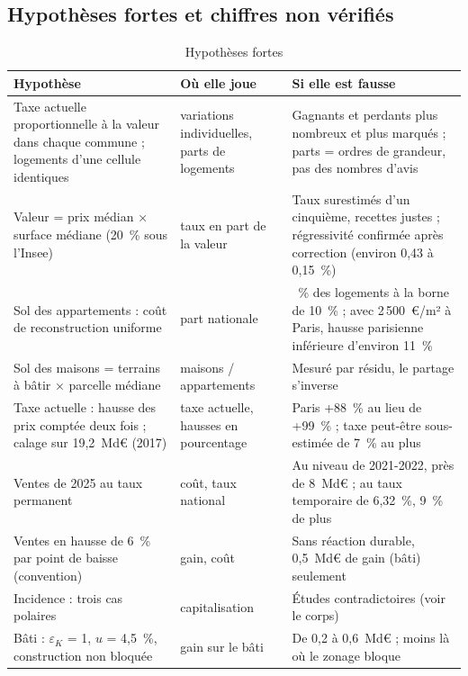 
\subsection{Hypothèses fortes et chiffres non vérifiés}

\begin{table}[!htbp]\centering\scriptsize
\caption{Hypothèses fortes}\label{tab:fon_hyp}
\begin{tabularx}{\linewidth}{@{}>{\raggedright\arraybackslash}p{4.3cm}>{\raggedright\arraybackslash}p{2.4cm}>{\raggedright\arraybackslash}X@{}}
\toprule
Hypothèse & Où elle joue & Si elle est fausse \\
\midrule
Taxe actuelle proportionnelle à la valeur dans chaque commune ; logements d'une cellule identiques & variations individuelles, parts de logements & Gagnants et perdants plus nombreux et plus marqués ; parts = ordres de grandeur, pas des nombres d'avis \\
Valeur = prix médian × surface médiane (20~\% sous l'Insee) & taux en part de la valeur & Taux surestimés d'un cinquième, recettes justes ; régressivité confirmée après correction (environ 0,43 à 0,15~\%) \\
Sol des appartements : coût de reconstruction uniforme & part nationale & 9~\% des logements à la borne de 10~\% ; avec 2\,500~€/m² à Paris, hausse parisienne inférieure d'environ 11~\% \\
Sol des maisons = terrains à bâtir × parcelle médiane & maisons / appartements & Mesuré par résidu, le partage s'inverse \\
Taxe actuelle : hausse des prix comptée deux fois ; calage sur 19,2~Md€ (2017) & taxe actuelle, hausses en pourcentage & Paris +88~\% au lieu de +99~\% ; taxe peut-être sous-estimée de 7~\% au plus \\
Ventes de 2025 au taux permanent & coût, taux national & Au niveau de 2021-2022, près de 8~Md€ ; au taux temporaire de 6,32~\%, 9~\% de plus \\
Ventes en hausse de 6~\% par point de baisse (convention) & gain, coût & Sans réaction durable, 0,5~Md€ de gain (bâti) seulement \\
Incidence : trois cas polaires & capitalisation & Études contradictoires (voir le corps) \\
Bâti : $\varepsilon_K$ = 1, $u$ = 4,5~\%, construction non bloquée & gain sur le bâti & De 0,2 à 0,6~Md€ ; moins là où le zonage bloque \\

\end{tabularx}
\end{table}
